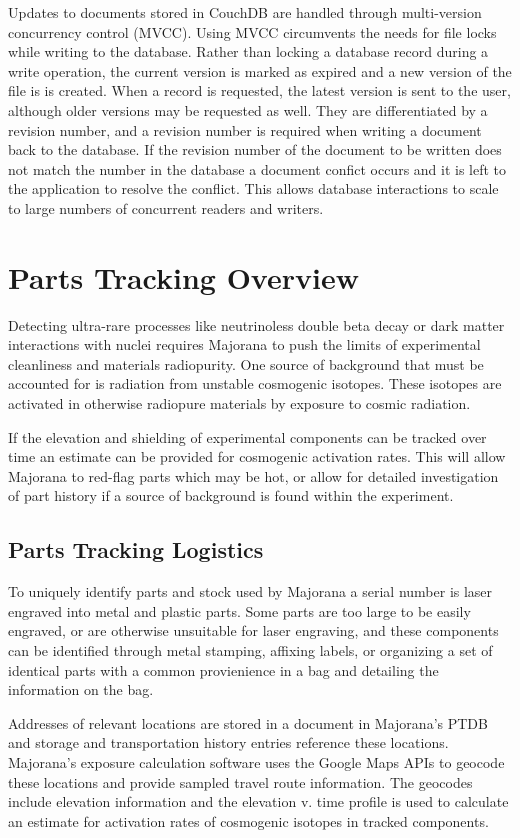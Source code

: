 \documentclass[journal]{IEEEtran}
\begin{document}
Updates to documents stored in CouchDB are handled through multi-version concurrency control (MVCC). Using MVCC
circumvents the needs for file locks while writing to the database. Rather than locking a database record during
a write operation, the current version is marked as expired and a new version of the file is is created. When a 
record is requested, the latest version is sent to the user, although older versions may be requested as well.
They are differentiated by a revision number, and a revision number is required when writing a document back 
to the database. If the revision number of the document to be written does not match the number in the database a 
document confict occurs and it is left to the application to resolve the conflict. This allows database interactions
to scale to large numbers of concurrent readers and writers.

\section{Parts Tracking Overview}
Detecting ultra-rare processes like neutrinoless double beta decay or dark matter interactions with nuclei requires
Majorana to push the limits of experimental cleanliness and materials radiopurity. One source of background that
must be accounted for is radiation from unstable cosmogenic isotopes. These isotopes are activated in otherwise
radiopure materials by exposure to cosmic radiation. 

If the elevation and shielding of experimental components
can be tracked over time an estimate can be provided for cosmogenic activation rates. This will allow Majorana
to red-flag parts which may be hot, or allow for detailed investigation of part history if a source of background
is found within the experiment.

\subsection{Parts Tracking Logistics}

To uniquely identify parts and stock used by Majorana a serial number is laser engraved into metal and plastic parts.
Some parts are too large to be easily engraved, or are otherwise unsuitable for laser engraving, and these
components can be identified through metal stamping, affixing labels, or organizing a set of identical parts
with a common provienience in a bag and detailing the information on the bag.

Addresses of relevant locations are stored in a document in Majorana's PTDB and storage and transportation history
entries reference these locations. Majorana's exposure calculation software uses the Google Maps APIs to geocode these
locations and provide sampled travel route information. The geocodes include elevation information and the elevation v. time
profile is used to calculate an estimate for activation rates of cosmogenic isotopes in tracked components.
\end{document}
